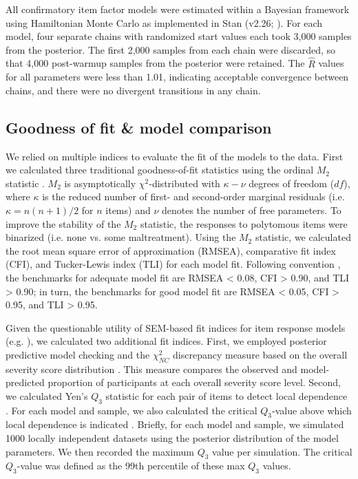 \documentclass[letterpaper,man,natbib,floatsintext,longtable]{apa6}
\begin{document}
All confirmatory item factor models were estimated within a Bayesian framework using Hamiltonian Monte Carlo as implemented in Stan (v2.26; \citealt{carpenter2017stan}). For each model, four separate chains with randomized start values each took 3,000 samples from the posterior. The first 2,000 samples from each chain were discarded, so that 4,000 post-warmup samples from the posterior were retained. The $\hat{R}$ values for all parameters were less than 1.01, indicating acceptable convergence between chains, and there were no divergent transitions in any chain. 

\subsection{Goodness of fit \& model comparison}

We relied on multiple indices to evaluate the fit of the models to the data. First we calculated three traditional goodness-of-fit statistics using the ordinal $M_2$ statistic \citep{cai2013limited, maydeu2013goodness}. $M_2$ is asymptotically $\chi^2$-distributed with $\kappa − \nu$ degrees of freedom ($df$), where $\kappa$ is the reduced number of first- and second-order marginal residuals (i.e. $\kappa = n(n + 1)/2$ for $n$ items) and $\nu$ denotes the number of free parameters. To improve the stability of the $M_2$ statistic, the responses to polytomous items were binarized (i.e. none vs. some maltreatment). Using the $M_2$ statistic, we calculated the root mean square error of approximation (RMSEA), comparative fit index (CFI), and Tucker-Lewis index (TLI) for each model fit. Following convention \citep{hu1999cutoff}, the benchmarks for adequate model fit are RMSEA < 0.08, CFI > 0.90, and TLI > 0.90; in turn, the benchmarks for good model fit are RMSEA < 0.05, CFI > 0.95, and TLI > 0.95. 

Given the questionable utility of SEM-based fit indices for item response models (e.g. \citealt{reise2014evaluating}), we calculated two additional fit indices. First, we employed posterior predictive model checking and the $\chi^2_{NC}$ discrepancy measure based on the overall severity score distribution \citep{sinharay2006posterior}. This measure compares the observed and model-predicted proportion of participants at each overall severity score level. Second, we calculated Yen's $Q_3$ statistic for each pair of items to detect local dependence \citep{yen1984effects}. For each model and sample, we also calculated the critical $Q_3$-value above which local dependence is indicated  \citep{christensen2017critical}. Briefly, for each model and sample, we simulated 1000 locally independent datasets using the posterior distribution of the model parameters. We then recorded the maximum $Q_3$ value per simulation. The critical $Q_3$-value was defined as the 99th percentile of these max $Q_3$ values. 
\end{document}
